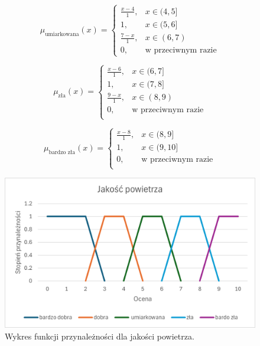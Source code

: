 \documentclass{article}
\begin{document}
\begin{enumerate}
\begin{equation}
\mu_{\text{umiarkowana}}(x) =
\begin{cases}
\frac{x - 4}{1}, & x \in (4, 5] \\
1, & x \in (5, 6] \\
\frac{7 - x}{1}, & x \in (6, 7) \\
0, & \text{w przeciwnym razie}
\end{cases}
\end{equation}  

                \begin{equation}
                    \mu_{\text{zła}}(x) =
                    \begin{cases}
                    \frac{x - 6}{1}, & x \in (6, 7] \\
                    1, & x \in (7, 8] \\
                    \frac{9 - x}{1}, & x \in (8, 9)\\
                    0, & \text{w przeciwnym razie} \\
                    \end{cases}
                \end{equation}

                \begin{equation}
                    \mu_{\text{bardzo zła}}(x) =
                    \begin{cases}
                    \frac{x - 8}{1}, &  x \in (8, 9] \\
                    1, & x \in (9, 10] \\
                    0, & \text{w przeciwnym razie} \\
                    \end{cases}
                \end{equation}

            \begin{figure}[H]
    \centering
    \includegraphics[width=\textwidth]{img/air.png}
    \caption{Wykres funkcji przynależności dla jakości powietrza.}
    \end{figure}
\end{enumerate}
\end{document}
